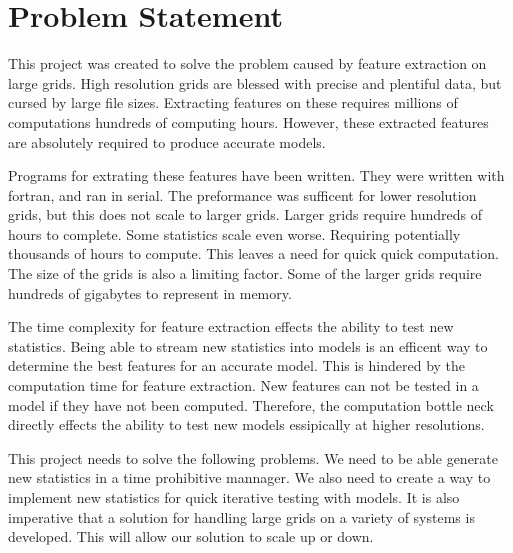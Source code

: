 \section{Problem Statement}
This project was created to solve the problem caused by feature extraction on large grids.
High resolution grids are blessed with precise and plentiful data, but cursed by large file sizes.
Extracting features on these requires millions of computations hundreds of computing hours.
However, these extracted features are absolutely required to produce accurate models.
%

\par
Programs for extrating these features have been written. 
They were written with fortran, and ran in serial.
The preformance was sufficent for lower resolution grids, but this does not scale to larger grids.
Larger grids require hundreds of hours to complete.
Some statistics scale even worse.
Requiring potentially thousands of hours to compute. 
This leaves a need for quick quick computation.
The size of the grids is also a limiting factor. 
Some of the larger grids require hundreds of gigabytes to represent in memory.

\par
The time complexity for feature extraction effects the ability to test new statistics.
Being able to stream new statistics into models is an efficent way to determine the best features for an accurate model.
This is hindered by the computation time for feature extraction.
New features can not be tested in a model if they have not been computed.
Therefore, the computation bottle neck directly effects the ability to test new models essipically at higher resolutions.

\par
This project needs to solve the following problems.
We need to be able generate new statistics in a time prohibitive mannager.
We also need to create a way to implement new statistics for quick iterative testing with models.
It is also imperative that a solution for handling large grids on a variety of systems is developed.
This will allow our solution to scale up or down.

